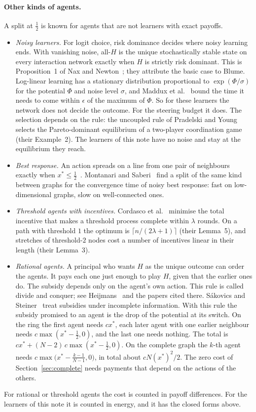 \documentclass[11pt,a4paper]{article}
\theoremstyle{definition}
\theoremstyle{plain}
\newcommand{\xs}{x^{*}}
\begin{document}
\paragraph{Other kinds of agents.}
A split at $\tfrac12$ is known for agents that are not learners with exact payoffs.
\begin{itemize}
\item \emph{Noisy learners.} For logit choice, risk dominance decides where noisy learning ends. With vanishing noise, all-$H$ is the unique stochastically stable state on every interaction network exactly when $H$ is strictly risk dominant. This is Proposition~1 of Nax and Newton~\cite{naxnewton2022}; they attribute the basic case to Blume. Log-linear learning has a stationary distribution proportional to $\exp(\Phi/\sigma)$ for the potential $\Phi$ and noise level $\sigma$, and Maddux et al.~\cite{maddux2024} bound the time it needs to come within $\epsilon$ of the maximum of $\Phi$. So for these learners the network does not decide the outcome. For the steering budget it does. The selection depends on the rule: the uncoupled rule of Pradelski and Young~\cite{pradelski2012} selects the Pareto-dominant equilibrium of a two-player coordination game (their Example~2). The learners of this note have no noise and stay at the equilibrium they reach.
\item \emph{Best response.} An action spreads on a line from one pair of neighbours exactly when $\xs\le\tfrac12$~\cite{morris2000}. Montanari and Saberi~\cite{montanari2009} find a split of the same kind between graphs for the convergence time of noisy best response: fast on low-dimensional graphs, slow on well-connected ones.
\item \emph{Threshold agents with incentives.} Cordasco et al.~\cite{cordasco2018} minimise the total incentive that makes a threshold process complete within $\lambda$ rounds. On a path with threshold $1$ the optimum is $\lceil n/(2\lambda+1)\rceil$ (their Lemma~5), and stretches of threshold-$2$ nodes cost a number of incentives linear in their length (their Lemma~3).
\item \emph{Rational agents.} A principal who wants $H$ as the unique outcome can order the agents. It pays each one just enough to play $H$, given that the earlier ones do. The subsidy depends only on the agent's own action. This rule is called divide and conquer; see Heijmans~\cite{heijmans2023} and the papers cited there. S\'akovics and Steiner~\cite{sakovics2012} treat subsidies under incomplete information. With this rule the subsidy promised to an agent is the drop of the potential at its switch. On the ring the first agent needs $c\xs$, each later agent with one earlier neighbour needs $c\max(\xs-\tfrac12,0)$, and the last one needs nothing. The total is $c\xs+(N-2)\,c\max(\xs-\tfrac12,0)$. On the complete graph the $k$-th agent needs $c\max\bigl(\xs-\tfrac{k-1}{N-1},0\bigr)$, in total about $cN(\xs)^{2}/2$. The zero cost of Section~\ref{sec:complete} needs payments that depend on the actions of the others.
\end{itemize}
For rational or threshold agents the cost is counted in payoff differences. For the learners of this note it is counted in energy, and it has the closed forms above.
\end{document}
